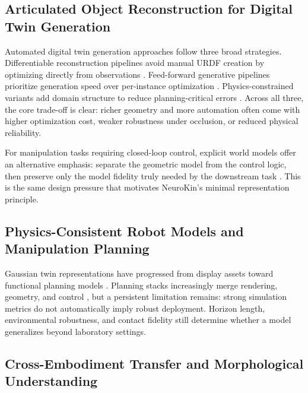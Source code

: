 \documentclass[12pt,a4paper,oneside]{report}
\begin{document}
\subsection{Articulated Object Reconstruction for Digital Twin Generation}

Automated digital twin generation approaches follow three broad strategies. Differentiable reconstruction pipelines avoid manual URDF creation by optimizing directly from observations \cite{heiden2022inferring, weng2024neural}. Feed-forward generative pipelines prioritize generation speed over per-instance optimization \cite{li2025art, wu2025urdfanything, wang2025artllm, wang2025kinematify}. Physics-constrained variants add domain structure to reduce planning-critical errors \cite{zhang2025simart, xu2025motionanymesh, wu2024aomgen}. Across all three, the core trade-off is clear: richer geometry and more automation often come with higher optimization cost, weaker robustness under occlusion, or reduced physical reliability.

For manipulation tasks requiring closed-loop control, explicit world models offer an alternative emphasis: separate the geometric model from the control logic, then preserve only the model fidelity truly needed by the downstream task \cite{li2024explicit}. This is the same design pressure that motivates NeuroKin's minimal representation principle.

\subsection{Physics-Consistent Robot Models and Manipulation Planning}

Gaussian twin representations have progressed from display assets toward functional planning models \cite{lou2024robogs, guo2025articulatedgs, yu2025artgs, wu2025reartgs, dai2025freeartgs, chen2025freegaussian}. Planning stacks increasingly merge rendering, geometry, and control \cite{sun2026digitaltwin, lu2024manigaussian, pan2025selfcorrecting, jiang2025gsworld, escontrela2025gaussgym}, but a persistent limitation remains: strong simulation metrics do not automatically imply robust deployment. Horizon length, environmental robustness, and contact fidelity still determine whether a model generalizes beyond laboratory settings.

\subsection{Cross-Embodiment Transfer and Morphological Understanding}
\end{document}
